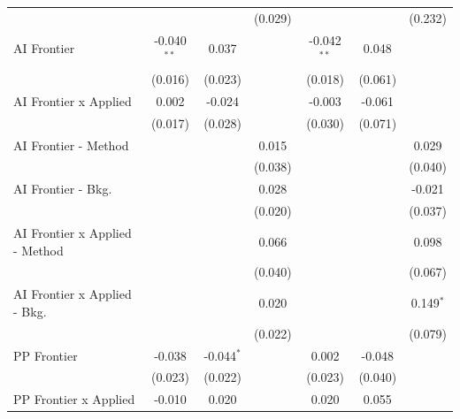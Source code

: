 \begin{tabular}{lcccccc}
                                  &                &                & (0.029)       &                &               & (0.232)\\   
   AI Frontier                    & -0.040$^{**}$  & 0.037          &               & -0.042$^{**}$  & 0.048         &   \\   
                                  & (0.016)        & (0.023)        &               & (0.018)        & (0.061)       &   \\   
   AI Frontier x Applied          & 0.002          & -0.024         &               & -0.003         & -0.061        &   \\   
                                  & (0.017)        & (0.028)        &               & (0.030)        & (0.071)       &   \\   
   AI Frontier - Method           &                &                & 0.015         &                &               & 0.029\\   
                                  &                &                & (0.038)       &                &               & (0.040)\\   
   AI Frontier - Bkg.             &                &                & 0.028         &                &               & -0.021\\   
                                  &                &                & (0.020)       &                &               & (0.037)\\   
   AI Frontier x Applied - Method &                &                & 0.066         &                &               & 0.098\\   
                                  &                &                & (0.040)       &                &               & (0.067)\\   
   AI Frontier x Applied - Bkg.   &                &                & 0.020         &                &               & 0.149$^{*}$\\   
                                  &                &                & (0.022)       &                &               & (0.079)\\   
   PP Frontier                    & -0.038         & -0.044$^{*}$   &               & 0.002          & -0.048        &   \\   
                                  & (0.023)        & (0.022)        &               & (0.023)        & (0.040)       &   \\   
   PP Frontier x Applied          & -0.010         & 0.020          &               & 0.020          & 0.055         &   \\   

\end{tabular}
